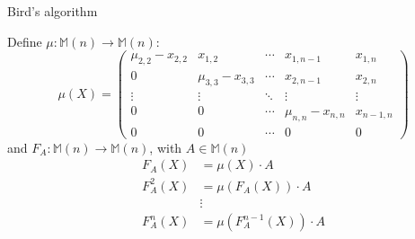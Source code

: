 \documentclass{beamer}
\begin{document}
\begin{frame}{Bird's algorithm}

    Define $\mu : \mathbb{M}(n) \to \mathbb{M}(n)$:
    \[
        \mu(X) =
        \begin{pmatrix}{}
            \mu_{2,2} - x_{2,2} & x_{1,2}             & \cdots & x_{1,n-1}           & x_{1,n} \\
            0                   & \mu_{3,3} - x_{3,3} & \cdots & x_{2,n-1}           & x_{2,n} \\
            \vdots              & \vdots              & \ddots & \vdots              & \vdots \\
            0                   & 0                   & \cdots & \mu_{n,n} - x_{n,n} & x_{n-1,n} \\
            0                   & 0                   & \cdots & 0                   & 0
        \end{pmatrix}
    \]
    and $F_A : \mathbb{M}(n) \to \mathbb{M}(n)$,
    with $A \in \mathbb{M}(n)$
    \begin{align*}{}
        F_A(X)    & = \mu(X)\cdot A \\
        F_A^2(X)  & = \mu(F_A(X)) \cdot A \\
                  & \vdots \\
        F_A^n(X)  & = \mu(F_A^{n-1}(X)) \cdot A \\
    \end{align*}

\end{frame}
\end{document}
